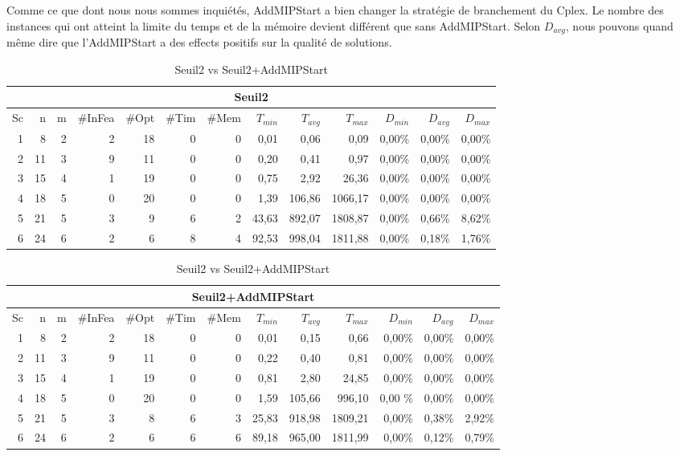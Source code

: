 Comme ce que dont nous nous sommes inquiétés, AddMIPStart a bien changer la stratégie de branchement du Cplex. Le nombre des instances qui ont atteint la limite du temps et de la mémoire devient différent que sans AddMIPStart. Selon $D_{avg}$, nous pouvons quand même dire que l'AddMIPStart a des effects positifs sur la qualité de solutions.
\begin{table}[h]
    \centering
    \begin{tabular}{|r|r|r|r|r|r|r|r|r|r|r|r|r|}
    	\hline
    	\multicolumn{13}{|c|}{Seuil2}\\ \hline
Sc &n	&m	&\#InFea	&\#Opt	&\#Tim &\#Mem	&$T_{min}$ & $T_{avg}$	& $T_{max}$ & $D_{min}$ & $D_{avg}$	& $D_{max}$ \\ \hline
1&	8 &	2&2	&18	&0	&0     &0,01	&0,06	&0,09	    &0,00\%	&0,00\%	&0,00\%    \\ \hline
2&	11&	3&9	&11	&0	&0     &0,20	&0,41	&0,97	    &0,00\%	&0,00\%	&0,00\%     \\ \hline
3&	15&	4&1	&19	&0	&0     &0,75	&2,92	&26,36	    &0,00\%	&0,00\%	&0,00\%    \\ \hline
4 &	18&	5&0	&20	&0	&0     &1,39	&106,86	&1066,17	&0,00\%	&0,00\%	&0,00\%    \\ \hline
5 &	21&	5&3	&9	&6	&2     &43,63	&892,07	&1808,87	&0,00\%	&0,66\%	&8,62\%     \\ \hline
6 &	24&	6&2	&6	&8	&4     &92,53	&998,04	&1811,88	&0,00\%	&0,18\%	&1,76\%    \\ \hline
    \end{tabular}
\medskip \par
    \begin{tabular}{|r|r|r|r|r|r|r|r|r|r|r|r|r|}
    	\hline
    	\multicolumn{13}{|c|}{Seuil2+AddMIPStart}\\ \hline
Sc &n	&m	&\#InFea	&\#Opt	&\#Tim &\#Mem	&$T_{min}$ & $T_{avg}$	& $T_{max}$ & $D_{min}$ & $D_{avg}$	& $D_{max}$ \\ \hline
1&	8 &	2&2	&18	&0	&0     &0,01	&0,15	&0,66	    &0,00\%	&0,00\%	&0,00\%    \\ \hline
2&	11&	3&9	&11	&0	&0     &0,22	&0,40	&0,81	    &0,00\%	&0,00\%	&0,00\%     \\ \hline
3&	15&	4&1	&19	&0	&0     &0,81	&2,80	&24,85	    &0,00\%	&0,00\%	&0,00\%    \\ \hline
4 &	18&	5&0	&20	&0	&0     &1,59	&105,66	&996,10 &   0,00 \%	&0,00\%	&0,00\%    \\ \hline
5 &	21&	5&3	&8	&6	&3     &25,83	&918,98	&1809,21	&0,00\%	&0,38\%	&2,92\%     \\ \hline
6 &	24&	6&2	&6	&6	&6     &89,18	&965,00	&1811,99	&0,00\%	&0,12\%	&0,79\%    \\ \hline
    \end{tabular} 
    \caption{Seuil2 vs Seuil2+AddMIPStart}
    \label{tab_cut2_ams2_tab2}
\end{table}
\bigskip

